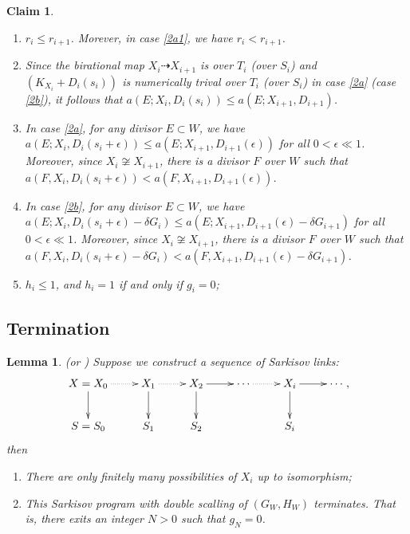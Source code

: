 \documentclass{article}
\newtheorem{lem}[defn]{Lemma}
\newtheorem{claim}[defn]{Claim}
\begin{document}
\begin{claim}\label{behavior2}
  \begin{enumerate}
    \item $r_{i}\leqslant r_{i+1}$. Morever, in case \ref{2a1}, we have $r_{i}<r_{i+1}$. 
    \item Since the birational map $X_{i}\dashrightarrow X_{i+1}$ is over $T_{i}$ (over $S_{i}$) and $(K_{X_{i}}+D_{i}(s_{i}))$ is numerically trival over $T_{i}$ (over $S_{i}$) in case \ref{2a} (case \ref{2b}), it follows that $a(E;X_{i},D_{i}(s_{i}))\leqslant a(E;X_{i+1},D_{i+1})$.
  \item  In case \ref{2a}, for any divisor $E \subset W$, we have $a(E;X_{i},D_{i}(s_{i}+\epsilon))\leqslant a(E;X_{i+1},D_{i+1}(\epsilon))$ for all $0<\epsilon\ll 1$. Moreover, since $X_{i} \not\cong X_{i+1}$, there is a divisor $F$ over $W$ such that  $a(F,X_{i},D_{i}(s_{i}+\epsilon))< a(F,X_{i+1},D_{i+1}(\epsilon))$.

  \item\label{2bdiscrepancy}   In case \ref{2b}, for any divisor $E \subset W$, we have $a(E;X_{i},D_{i}(s_{i}+\epsilon)-\delta G_{i})\leqslant a(E;X_{i+1},D_{i+1}(\epsilon)-\delta G_{i+1})$ for all $0<\epsilon\ll 1$. Moreover, since $X_{i} \not\cong X_{i+1}$, there is a divisor $F$ over $W$ such that  $a(F,X_{i},D_{i}(s_{i}+\epsilon)-\delta G_{i})< a(F,X_{i+1},D_{i+1}(\epsilon)-\delta G_{i+1})$.
  \item  $h_{i}\leqslant 1$, and $h_{i}=1$ if and only if $g_{i}=0$;
  \end{enumerate}
\end{claim}
\subsection{Termination}
\begin{lem}\label{termination2}
\cite[Lemma 13.18 and Lemma 13.19]{haconSarkisovProgram2011} (or \cite[Lemma 4.9]{liuSarkisovProgramGeneralized2019}) Suppose we construct a sequence of Sarkisov links: 
\[
  \xymatrix{
    X=X_0\ar@{.>}[r]\ar[d]&X_{1}\ar@{.>}[r]\ar[d]& X_{2}\ar[d]\ar[r] &\cdots\ar@{.>}[r]&X_{i}\ar[d] \ar[r] &\cdots\\
    S=S_{0}&S_{1} &S_{2}&&S_{i}
  }
,\]
then
  \begin{enumerate}
    \item There are only finitely many possibilities of $X_{i}$ up to isomorphism;

    \item This Sarkisov program with double scalling of $(G_{W},H_{W})$ terminates. That is, there exits an integer $N>0$ such that $g_{N}=0$.  
  \end{enumerate}
\end{lem}
\end{document}
